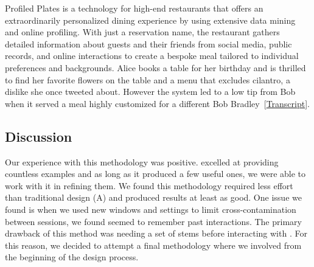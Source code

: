 
 {Profiled Plates is a technology for high-end restaurants that offers an extraordinarily personalized dining experience by using extensive data mining and online profiling. With just a reservation name, the restaurant gathers detailed information about guests and their friends from social media, public records, and online interactions to create a bespoke meal tailored to individual preferences and backgrounds. Alice books a table for her birthday and is thrilled to find her favorite flowers on the table and a menu that excludes cilantro, a dislike she once tweeted about. However the system led to a low tip from Bob when it served a meal highly customized for a different Bob Bradley~[\href{https://chatgpt.com/share/5a541220-b6d4-4faf-9b2e-4a979a6bbdf1}{\gpt Transcript}].}


\subsection{Discussion}

Our experience with this methodology was positive. \gpt excelled at providing countless examples and as long as it produced a few useful ones, we were able to work with it in refining them. We found this methodology required less effort than traditional design (A) and produced results at least as good. One issue we found is when we used new windows and settings to limit cross-contamination between sessions, we found \gpt seemed to remember past interactions. The primary drawback of this method was needing a set of stems before interacting with \gpt. For this reason, we decided to attempt a final methodology where we involved \gpt from the beginning of the design process. 

